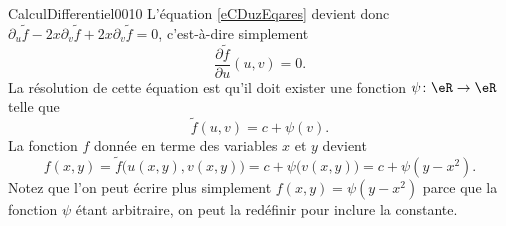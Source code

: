 \begin{corrige}{CalculDifferentiel0010}
	L'équation \eqref{eCDuzEqares} devient donc $\partial_u\tilde f-2x\partial_v\tilde f+2x\partial_v\tilde f=0$, c'est-à-dire simplement
	\begin{equation}
		\frac{ \partial \tilde f }{ \partial u }(u,v)=0.
	\end{equation}
	La résolution de cette équation est qu'il doit exister une fonction $\psi\colon \eR\to \eR$ telle que
	\begin{equation}
		\tilde f(u,v)=c+\psi(v).
	\end{equation}
	La fonction $f$ donnée en terme des variables $x$ et $y$ devient
	\begin{equation}
		f(x,y)=\tilde f\big( u(x,y),v(x,y) \big)=c+\psi\big( v(x,y) \big)=c+\psi(y-x^2).
	\end{equation}
	Notez que l'on peut écrire plus simplement $f(x,y)=\psi(y-x^2)$ parce que la fonction $\psi$ étant arbitraire, on peut la redéfinir pour inclure la constante.

\end{corrige}
